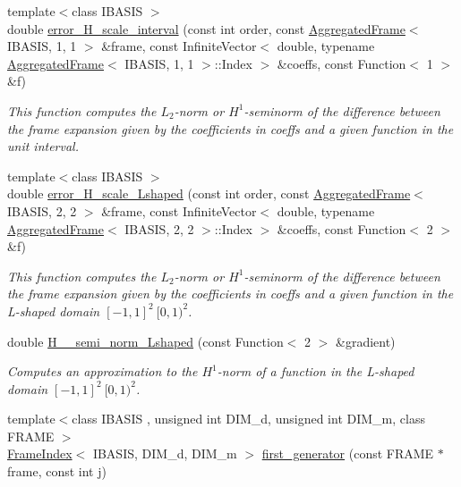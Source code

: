 \begin{CompactItemize}
\item 
{\footnotesize template$<$class IBASIS $>$ }\\double \hyperlink{namespaceFrameTL_addaaee53d308a6093a25ed95f86cc85}{error\_\-H\_\-scale\_\-interval} (const int order, const \hyperlink{classFrameTL_1_1AggregatedFrame}{AggregatedFrame}$<$ IBASIS, 1, 1 $>$ \&frame, const InfiniteVector$<$ double, typename \hyperlink{classFrameTL_1_1AggregatedFrame}{AggregatedFrame}$<$ IBASIS, 1, 1 $>$::Index $>$ \&coeffs, const Function$<$ 1 $>$ \&f)
\begin{CompactList}\small\item\em This function computes the $L_2$-norm or $H^1$-seminorm of the difference between the frame expansion given by the coefficients in coeffs and a given function in the unit interval. \item\end{CompactList}\item 
{\footnotesize template$<$class IBASIS $>$ }\\double \hyperlink{namespaceFrameTL_54aa679fc30456b9ca268846c1926992}{error\_\-H\_\-scale\_\-Lshaped} (const int order, const \hyperlink{classFrameTL_1_1AggregatedFrame}{AggregatedFrame}$<$ IBASIS, 2, 2 $>$ \&frame, const InfiniteVector$<$ double, typename \hyperlink{classFrameTL_1_1AggregatedFrame}{AggregatedFrame}$<$ IBASIS, 2, 2 $>$::Index $>$ \&coeffs, const Function$<$ 2 $>$ \&f)
\begin{CompactList}\small\item\em This function computes the $L_2$-norm or $H^1$-seminorm of the difference between the frame expansion given by the coefficients in coeffs and a given function in the L-shaped domain $[-1,1]^2 \ [0,1)^2$. \item\end{CompactList}\item 
double \hyperlink{namespaceFrameTL_3ce808a3f26fc1938139488a730e994d}{H\_\_\-semi\_\-norm\_\-Lshaped} (const Function$<$ 2 $>$ \&gradient)
\begin{CompactList}\small\item\em Computes an approximation to the $H^1$-norm of a function in the L-shaped domain $[-1,1]^2 \ [0,1)^2$. \item\end{CompactList}\item 
{\footnotesize template$<$class IBASIS , unsigned int DIM\_\-d, unsigned int DIM\_\-m, class FRAME $>$ }\\\hyperlink{classFrameTL_1_1FrameIndex}{FrameIndex}$<$ IBASIS, DIM\_\-d, DIM\_\-m $>$ \hyperlink{namespaceFrameTL_6f69a38cdff114000317fd48750b471b}{first\_\-generator} (const FRAME $\ast$frame, const int j)

\end{CompactItemize}
